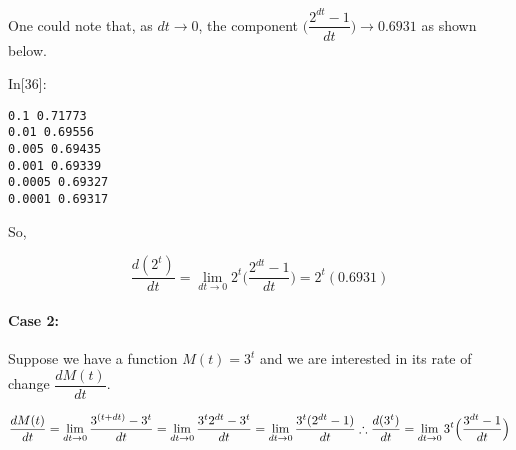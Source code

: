 \documentclass[float=false,crop=false]{standalone}
\begin{document}
    One could note that, as \(dt \to 0\), the component
\(\Big( \dfrac{2^{dt}-1}{dt} \Big) \to 0.6931\) as shown below.
\begin{InVerbatim}[commandchars=\\\{\},fontsize=\scriptsize]
{\color{incolor}In[{\color{incolor}36}]:}   \PY{p}{[}    \PY{p}{]}
           \PY{p}{[}     \PY{p}{]}
\end{InVerbatim}
    \begin{Verbatim}[commandchars=\\\{\},fontsize=\footnotesize]
0.1 0.71773
0.01 0.69556
0.005 0.69435
0.001 0.69339
0.0005 0.69327
0.0001 0.69317

    \end{Verbatim}

    So,

\begin{equation}
    \dfrac{d(2^t)}{dt} = \lim_{dt \to 0} 2^t\Big(\dfrac{2^{dt}-1}{dt}\Big) = 2^t(0.6931)
\end{equation}

    \paragraph{Case 2:}\label{case-2}

Suppose we have a function \(M(t) = 3^t\) and we are interested in its
rate of change \(\dfrac{dM(t)}{dt}\).

    \[
\dfrac{dM(t)}{dt} =  \lim_{dt \to 0} \dfrac{3^{(t+dt)}-3^t}{dt} =  \lim_{dt \to 0} \dfrac{3^t2^{dt} - 3^t}{dt} 
=  \lim_{dt \to 0} \dfrac{3^t(2^{dt} - 1)}{dt} \\
\therefore \dfrac{d(3^t)}{dt} = \lim_{dt \to 0} 3^t\Big(\dfrac{3^{dt}-1}{dt}\Big)
\]
\end{document}
